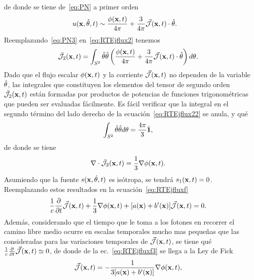 de donde se tiene de~\eqref{eq:PN} a primer orden
\begin{equation}
\begin{split}
\begin{aligned}
u(\mathbf{x},\hat{\theta},t)&\sim \frac{\phi(\mathbf{x},t)}{4\pi}+\frac{3}{4\pi} \vec{ \mathcal{J}}(\mathbf{x},t) \cdot \hat{\theta}.
\end{aligned}
\end{split}
\label{eq:PN3}
\end{equation}
Reemplazando~\eqref{eq:PN3} en~\eqref{eq:RTEjflux2} tenemos
\begin{equation}
\bar{\mathcal{J}}_2(\mathbf{x},t)=\int_{S^2} \hat{\theta} \hat{\theta} \left(  \frac{\phi(\mathbf{x},t)}{4\pi}+\frac{3}{4\pi} \vec{ \mathcal{J}}(\mathbf{x},t) \cdot \hat{\theta} \right) d\theta.
\label{eq:RTEjflux22}
\end{equation}
Dado que el flujo escalar $\phi(\mathbf{x},t)$ y la corriente $\vec{ \mathcal{J}}(\mathbf{x},t)$ no dependen de la variable $\hat{\theta}$, las integrales que 
constituyen los elementos del tensor de segundo orden $\bar{\mathcal{J}}_2(\mathbf{x},t)$ están formadas 
por productos de potencias de funciones trigonométricas que pueden ser evaluadas fácilmente. 
Es fácil verificar que la integral en el segundo término del lado derecho de la ecuación~\eqref{eq:RTEjflux22} se anula, y qué~\cite[cap. 17, p. 544]{Modest2013}
\begin{equation}
\int_{S^2} \hat{\theta} \hat{\theta} d\theta=\frac{4\pi}{3} \bar{\mathbf{1}},
\label{eq:RTEjflux23}
\end{equation}
de donde se tiene 
\begin{equation}
\nabla \cdot \bar{\mathcal{J}}_2(\mathbf{x},t)=\frac{1}{3}\nabla \phi(\mathbf{x},t).
\label{eq:RTEjflux24}
\end{equation}
Asumiendo que la fuente $s(\mathbf{x},\hat{\theta},t)$ es isótropa, se tendrá $s_1(\mathbf{x},t)= 0$. Reemplazando estos resultados en la ecuación~\eqref{eq:RTEjfluxf}
\begin{equation}
\begin{split}
\begin{aligned}
\frac{1}{c}\frac{\partial}{\partial t} \vec{ \mathcal{J}}(\mathbf{x},t)+\frac{1}{3}\nabla  \phi(\mathbf{x},t) +[a(\mathbf{x})+b'(\mathbf{x})]\vec{ \mathcal{J}}(\mathbf{x},t)=0.
\end{aligned}
\end{split}
\label{eq:RTEjfluxf3}
\end{equation}
Además, considerando que el tiempo que le toma a los fotones en recorrer 
el camino libre medio ocurre en escalas temporales mucho 
mas pequeñas que las consideradas para las variaciones temporales de $\vec{ \mathcal{J}}(\mathbf{x},t)$, se 
tiene qué $\frac{1}{c}\frac{\partial}{\partial t} \vec{ \mathcal{J}}(\mathbf{x},t) \simeq 0$, de donde de 
la ec.~\eqref{eq:RTEjfluxf3} se llega a la Ley de Fick
\begin{equation}
\begin{split}
\begin{aligned}
\vec{ \mathcal{J}}(\mathbf{x},t)=-\frac{1}{3[a(\mathbf{x})+b'(\mathbf{x})]} \nabla  \phi(\mathbf{x},t) ,
\end{aligned}
\end{split}
\label{eq:Fick}
\end{equation}
